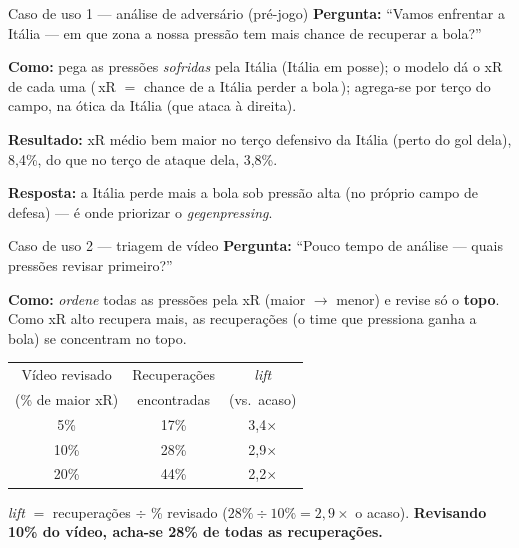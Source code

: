 \documentclass[aspectratio=169,11pt]{beamer}
\begin{document}
\begin{frame}{Caso de uso 1 --- análise de adversário (pré-jogo)}
  \small
  \textbf{Pergunta:} ``Vamos enfrentar a Itália --- em que zona a nossa pressão tem mais chance de recuperar a bola?''

  \vspace{1mm}
  \textbf{Como:} pega as pressões \emph{sofridas} pela Itália (Itália em posse); o modelo dá o xR de
  cada uma (\,xR $=$ chance de a Itália \alert{perder} a bola\,); agrega-se por terço do campo, na
  ótica da Itália (que ataca à direita).

  \vspace{1mm}
  \textbf{Resultado:} xR médio bem maior no \alert{terço defensivo da Itália} (perto do gol dela),
  \alert{8,4\%}, do que no terço de ataque dela, 3,8\%.

  \vspace{1mm}
  \textbf{Resposta:} a Itália perde mais a bola sob pressão \alert{alta} (no próprio campo de defesa)
  --- é onde priorizar o \emph{gegenpressing}.
\end{frame}

\begin{frame}{Caso de uso 2 --- triagem de vídeo}
  \small
  \textbf{Pergunta:} ``Pouco tempo de análise --- quais pressões revisar primeiro?''

  \vspace{1mm}
  \textbf{Como:} \emph{ordene} todas as pressões pela xR (maior $\to$ menor) e revise só o
  \textbf{topo}. Como xR alto recupera mais, as \alert{recuperações} (o time que pressiona ganha a
  bola) se concentram no topo.
  \begin{center}
    \begin{tabular}{ccc}
      \toprule
      Vídeo revisado & Recuperações & \emph{lift} \\
      (\% de maior xR) & encontradas & (vs.\ acaso) \\
      \midrule
      5\%  & 17\% & 3,4$\times$ \\
      10\% & \alert{28\%} & \alert{2,9$\times$} \\
      20\% & 44\% & 2,2$\times$ \\
      \bottomrule
    \end{tabular}
  \end{center}
  {\footnotesize \emph{lift} $=$ recuperações $\div$ \% revisado ($28\%\div10\%=2{,}9\times$ o acaso).
  \textbf{Revisando 10\% do vídeo, acha-se 28\% de todas as recuperações.}}
\end{frame}
\end{document}
